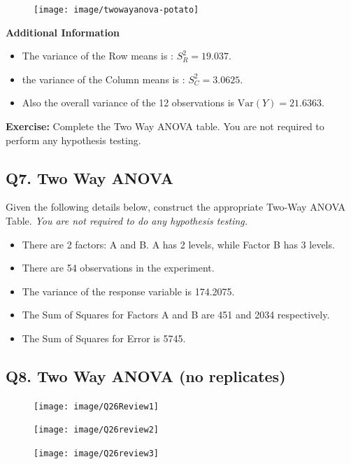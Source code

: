 \documentclass[a4paper,12pt]{article}
\begin{document}
\begin{figure}[h!]
	\centering
	\texttt{[image: image/twowayanova-potato]}
\end{figure}
\noindent \textbf{Additional Information} 

\begin{itemize}
	\item The variance of the Row means is : $S^2_{R} = 19.037$. 
	\item the variance of the Column means is : $S^2_{C} = 3.0625$.	
	\item Also the overall variance of the 12 observations is $\textrm{Var}(Y) = 21.6363 $. 
\end{itemize}

\noindent \textbf{Exercise:} Complete the Two Way ANOVA table. You are not required to perform any hypothesis testing.
\newpage

\subsection*{Q7. Two Way ANOVA }
Given the following details below, construct the appropriate Two-Way ANOVA Table. \textit{You are not required to do any hypothesis testing.}

\begin{itemize}
	\item There are 2 factors: A and B. A has 2 levels, while Factor B has 3 levels.
	\item There are 54 observations in the experiment.
	\item The variance of the response variable is 174.2075.
	\item The Sum of Squares for Factors A and B are 451  and  2034 respectively.
	\item The Sum of Squares for Error is 5745.
\end{itemize}

\newpage


\subsection*{Q8. Two Way ANOVA (no replicates)}
\begin{figure}[h!]
	\centering
	\texttt{[image: image/Q26Review1]}
	
\end{figure}
\begin{figure}[h!]
	\centering
	\texttt{[image: image/Q26review2]}
	
\end{figure}
\begin{figure}[h!]
	\centering
	\texttt{[image: image/Q26review3]}
	
\end{figure}
\newpage
\end{document}
